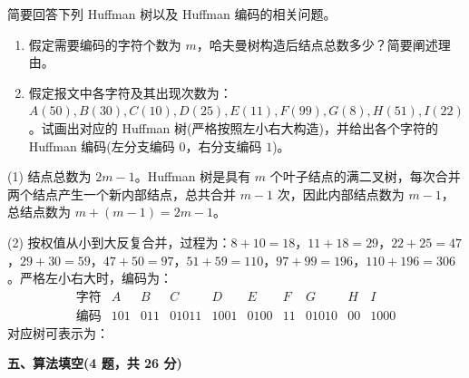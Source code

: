 \begin{question}
简要回答下列 Huffman 树以及 Huffman 编码的相关问题。
\begin{enumerate}
  \item 假定需要编码的字符个数为 $m$，哈夫曼树构造后结点总数多少？简要阐述理由。
  \item 假定报文中各字符及其出现次数为：$A(50),B(30),C(10),D(25),E(11),F(99),G(8),H(51),I(22)$。试画出对应的 Huffman 树(严格按照左小右大构造)，并给出各个字符的 Huffman 编码(左分支编码 $0$，右分支编码 $1$)。
\end{enumerate}
\begin{solution}
(1) 结点总数为 $2m-1$。Huffman 树是具有 $m$ 个叶子结点的满二叉树，每次合并两个结点产生一个新内部结点，总共合并 $m-1$ 次，因此内部结点数为 $m-1$，总结点数为 $m+(m-1)=2m-1$。\par
(2) 按权值从小到大反复合并，过程为：$8+10=18$，$11+18=29$，$22+25=47$，$29+30=59$，$47+50=97$，$51+59=110$，$97+99=196$，$110+196=306$。严格左小右大时，编码为：
\[
\begin{array}{c|ccccccccc}
\text{字符} & A&B&C&D&E&F&G&H&I \\ \hline
\text{编码} & 101&011&01011&1001&0100&11&01010&00&1000
\end{array}
\]
对应树可表示为：
\begin{center}
\end{center}
\end{solution}
\end{question}

\textbf{五、算法填空(4 题，共 26 分)}


